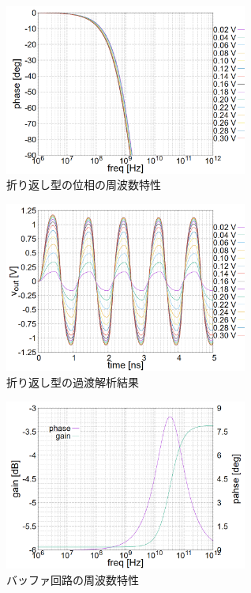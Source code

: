\documentclass[twocolumn]{jsarticle}
\begin{document}
    \begin{figure}[H]
        \begin{center}
            \includegraphics*[width = 80mm]{figures/NtoN_ac_phase.PNG}
            \caption{折り返し型の位相の周波数特性}
            \label{fig:sim_NtoN_ac_phase}
        \end{center}
    \end{figure}
    \begin{figure}[H]
        \begin{center}
            \includegraphics*[width = 80mm]{figures/NtoN_tr.PNG}
            \caption{折り返し型の過渡解析結果}
            \label{fig:sim_NtoN_tr}
        \end{center}
    \end{figure}
    \begin{figure}[H]
        \begin{center}
            \includegraphics*[width = 80mm]{figures/buf_ac.PNG}
            \caption{バッファ回路の周波数特性}
            \label{fig:sim_buf_ac}
        \end{center}
    \end{figure}
\end{document}
